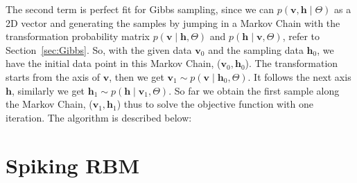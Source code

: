 \documentclass[11pt,twoside,a4paper]{article}
\begin{document}
	The second term is perfect fit for Gibbs sampling, since we can $ p(\mathbf{v}, \mathbf{h} \mid \Theta) $ as a 2D vector and generating the samples by jumping in a Markov Chain with the transformation probability matrix $ p(\mathbf{v} \mid \mathbf{h}, \Theta) $ and $ p(\mathbf{h} \mid \mathbf{v}, \Theta) $, refer to Section~\ref{sec:Gibbs}.
	So, with the given data $ \mathbf{v}_0 $ and the sampling data $ \mathbf{h}_0 $, we have the initial data point in this Markov Chain,  ($ \mathbf{v}_0, \mathbf{h}_0$).
	The transformation starts from the axis of $ \mathbf{v} $, then we get $ \mathbf{v}_1 \sim p( \mathbf{v} \mid \mathbf{h}_0, \Theta) $.
	It follows the next axis $ \mathbf{h} $, similarly we get $ \mathbf{h}_1 \sim p( \mathbf{h} \mid \mathbf{v}_1, \Theta) $.
	So far we obtain the first sample along the Markov Chain, ($ \mathbf{v}_1, \mathbf{h}_1$) thus to solve the objective function with one iteration.
	The algorithm is described below:   
\section{Spiking RBM\cite{neftci2013event}}
\end{document}
